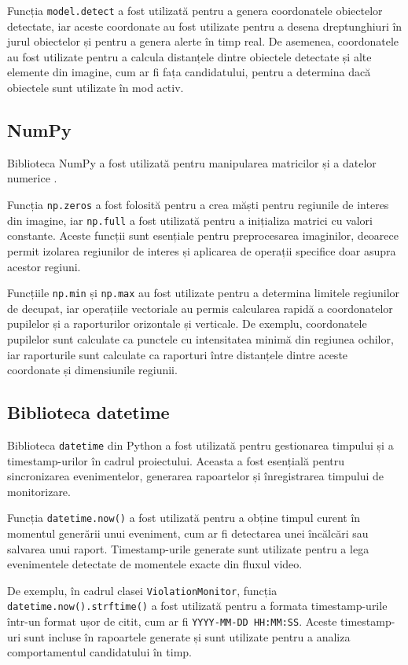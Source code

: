 \documentclass[12pt,a4paper]{article}
\begin{document}
Funcția \texttt{model.detect} a fost utilizată pentru a genera coordonatele obiectelor detectate, iar aceste coordonate au fost utilizate pentru a desena dreptunghiuri în jurul obiectelor și pentru a genera alerte în timp real. De asemenea, coordonatele au fost utilizate pentru a calcula distanțele dintre obiectele detectate și alte elemente din imagine, cum ar fi fața candidatului, pentru a determina dacă obiectele sunt utilizate în mod activ.

\subsection{NumPy}
Biblioteca NumPy a fost utilizată pentru manipularea matricilor și a datelor numerice \cite{numpy}. 

Funcția \texttt{np.zeros} a fost folosită pentru a crea măști pentru regiunile de interes din imagine, iar \texttt{np.full} a fost utilizată pentru a inițializa matrici cu valori constante. Aceste funcții sunt esențiale pentru preprocesarea imaginilor, deoarece permit izolarea regiunilor de interes și aplicarea de operații specifice doar asupra acestor regiuni.

Funcțiile \texttt{np.min} și \texttt{np.max} au fost utilizate pentru a determina limitele regiunilor de decupat, iar operațiile vectoriale au permis calcularea rapidă a coordonatelor pupilelor și a raporturilor orizontale și verticale. De exemplu, coordonatele pupilelor sunt calculate ca punctele cu intensitatea minimă din regiunea ochilor, iar raporturile sunt calculate ca raporturi între distanțele dintre aceste coordonate și dimensiunile regiunii.

\subsection{Biblioteca datetime}
Biblioteca \texttt{datetime}\cite{datetime} din Python a fost utilizată pentru gestionarea timpului și a timestamp-urilor în cadrul proiectului. Aceasta a fost esențială pentru sincronizarea evenimentelor, generarea rapoartelor și înregistrarea timpului de monitorizare.

Funcția \texttt{datetime.now()} a fost utilizată pentru a obține timpul curent în momentul generării unui eveniment, cum ar fi detectarea unei încălcări sau salvarea unui raport. Timestamp-urile generate sunt utilizate pentru a lega evenimentele detectate de momentele exacte din fluxul video.

De exemplu, în cadrul clasei \texttt{ViolationMonitor}, funcția \texttt{datetime.now().strftime()} a fost utilizată pentru a formata timestamp-urile într-un format ușor de citit, cum ar fi \texttt{YYYY-MM-DD HH:MM:SS}. Aceste timestamp-uri sunt incluse în rapoartele generate și sunt utilizate pentru a analiza comportamentul candidatului în timp.
\end{document}

